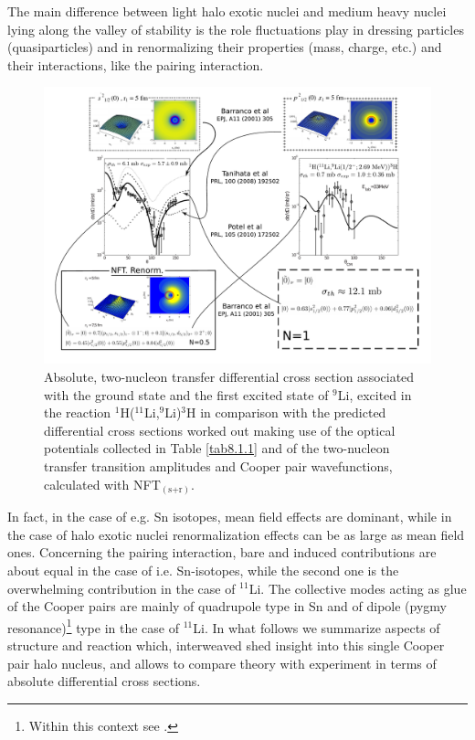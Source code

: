  
  The main difference between light halo exotic nuclei and medium heavy  nuclei lying along the valley of stability is the role fluctuations play in dressing particles (quasiparticles) and in renormalizing their properties (mass, charge, etc.) and their interactions, like the pairing interaction.
  \begin{figure}
  \centerline{\includegraphics*[width=18cm,angle=0]{C8/figsC8/fig8_1_3}}
  	\caption{Absolute, two-nucleon transfer differential cross section associated with the ground state and the first 	excited state of $^9$Li, excited  in the reaction $^1$H($^{11}$Li,$^9$Li)$^3$H \citep{Tanihata:08} in comparison with the  predicted differential cross sections \citep{Potel:10} worked out making use of the optical potentials collected in Table \ref{tab8.1.1} and of the two-nucleon transfer  transition amplitudes and  Cooper pair wavefunctions,  calculated with NFT$_{(\text{s+r})}$.  
  	}\label{fig8_1_2}
  \end{figure}
 In fact, in the case of e.g. Sn isotopes, mean field effects are dominant, while in the case of halo exotic nuclei renormalization effects can be as large as mean field ones. Concerning the pairing interaction, bare and induced contributions are about equal in the case of i.e. Sn-isotopes, while the second one is the overwhelming contribution in the case of $^{11}$Li. The collective modes acting as glue of the Cooper pairs are mainly of quadrupole type in Sn and of dipole (pygmy resonance)\footnote{Within this context see \cite{Broglia:19}.} type in the case of $^{11}$Li. In what follows we summarize aspects of structure and reaction which, interweaved shed insight into this single Cooper pair halo nucleus, and allows to compare theory with experiment in terms of absolute differential cross sections.

